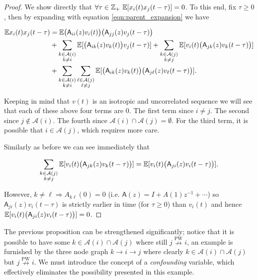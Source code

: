\documentclass[12pt]{article}
\def\npwgc{\overset{\text{PW}}{\nrightarrow}}  %
\def\A{\mathsf{A}}  %
\newcommand{\anc}[1]{\mathcal{A}(#1)}  %
\begin{document}
\begin{proof}
  We show directly that
  $\forall \tau \in \mathbb{Z}_+\ \mathbb{E}[x_i(t)x_j(t - \tau)] = 0$.  To this end,
  fix $\tau \ge 0$, then by expanding with equation \eqref{eqn:parent_expansion} we have

  \begin{align*}
    \E x_i(t)x_j(t - \tau) &= \E \big(\A_{ii}(z)v_i(t)\big)\big(\A_{jj}(z)v_j(t - \tau)\big)\\
    &+ \sum_{\substack{k \in \anc{i} \\ k \ne i}}\E[\big(\A_{ik}(z)v_k(t)\big)v_j(t - \tau)] + \sum_{\substack{k \in \anc{j} \\ k \ne j}}\E[v_i(t) \big(\A_{jk}(z) v_k(t - \tau)\big)]\\
    &+ \sum_{\substack{k \in \anc{i} \\ k \ne i}}\sum_{\substack{\ell \in \anc{j} \\ \ell \ne j}}\E[\big(\A_{ik}(z)v_k(t)\big)\big(\A_{j\ell}(z)v_\ell(t - \tau)\big)].
  \end{align*}

  
  Keeping in mind that $v(t)$ is an isotropic and uncorrelated
  sequence we will see that each of these above four terms are 0.  The
  first term since $i \ne j$.  The second since $j \not\in \anc{i}$.
  The fourth since $\anc{i} \cap \anc{j} = \emptyset$.  For the third
  term, it is possible that $i \in \anc{j}$, which requires more care.

  Similarly as before we can see immediately that

  \begin{equation*}
    \sum_{\substack{k \in \anc{j} \\ k \ne j}}\E[v_i(t) \big(\A_{jk}(z) v_k(t - \tau)\big)] = \E[v_i(t)\big(\A_{ji}(z)v_i(t - \tau)\big)].
  \end{equation*}

  However, $k \ne \ell \Rightarrow A_{k\ell}(0) = 0$ (i.e.
  $\A(z) = I + A(1)z^{-1} + \cdots$) so $\A_{ji}(z)v_i(t - \tau)$ is
  strictly earlier in time (for $\tau \ge 0$) than $v_i(t)$ and hence
  $\E[v_i(t)\big(\A_{ji}(z)v_i(t - \tau)\big)] = 0$.
\end{proof}

The previous proposition can be strengthened significantly; notice
that it is possible to have some $k \in \anc{i} \cap \anc{j}$ where still
$j \npwgc i$, an example is furnished by the three node graph
$k \rightarrow i \rightarrow j$ where clearly
$k \in \anc{i}\cap\anc{j}$ but $j \npwgc i$.  We must introduce the concept
of a \textit{confounding} variable, which effectively eliminates the
possibility presented in this example.
\end{document}
